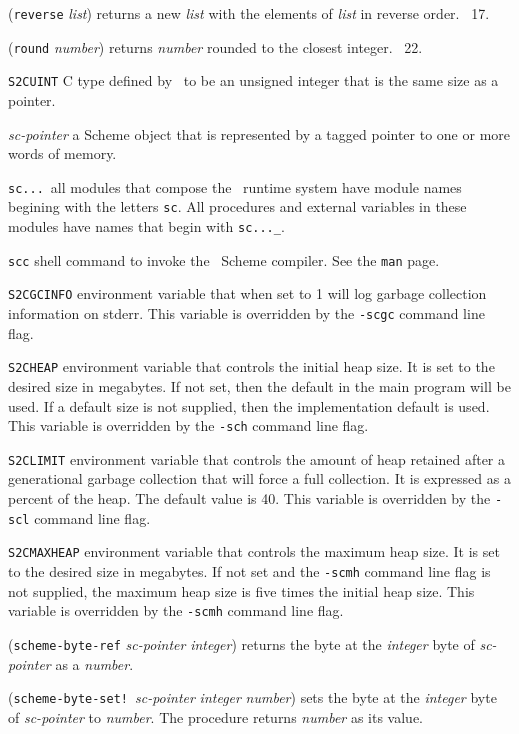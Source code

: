 \documentclass[10pt,twocolumn]{article}
\begin{document}
(\texttt{reverse} \emph{list}) returns a new \emph{list} with the
elements of \emph{list} in reverse order.  \RRRRRS~17.

(\texttt{round} \emph{number}) returns \emph{number} rounded to the
closest integer.  \RRRRRS~22.

\texttt{S2CUINT} C type defined by \StoC\ to be an unsigned integer
that is the same size as a pointer.

\emph{sc-pointer} a Scheme object that is represented by a tagged
pointer to one or more words of memory.

\texttt{sc...}\ all modules that compose the \StoC\ runtime system
have module names begining with the letters \texttt{sc}.  All
procedures and external variables in these modules have names that
begin with \texttt{sc...\_}.

\texttt{scc} shell command to invoke the \StoC\ Scheme compiler.  See
the \texttt{man} page.

\texttt{S2CGCINFO} environment variable that when set to 1 will log
garbage collection information on stderr.  This variable is overridden
by the \texttt{-scgc} command line flag.

\texttt{S2CHEAP} environment variable that controls the initial heap
size.  It is set to the desired size in megabytes.  If not set, then
the default in the main program will be used.  If a default size is
not supplied, then the implementation default is used.  This variable
is overridden by the \texttt{-sch} command line flag.

\texttt{S2CLIMIT} environment variable that controls the amount of heap
retained after a generational garbage collection that will force a
full collection.  It is expressed as a percent of the heap.  The
default value is 40.  This variable is overridden by the \texttt{-scl}
command line flag.

\texttt{S2CMAXHEAP} environment variable that controls the maximum heap
size.  It is set to the desired size in megabytes.  If not set and the
\texttt{-scmh} command line flag is not supplied, the maximum heap
size is five times the initial heap size. This variable is overridden
by the \texttt{-scmh} command line flag.

(\texttt{scheme-byte-ref} \emph{sc-pointer} \emph{integer}) returns
the byte at the \emph{integer} byte of \emph{sc-pointer} as a
\emph{number}.

(\texttt{scheme-byte-set!}\ \emph{sc-pointer} \emph{integer}
\emph{number}) sets the byte at the \emph{integer} byte of
\emph{sc-pointer} to \emph{number}.  The procedure returns
\emph{number} as its value.
\end{document}
